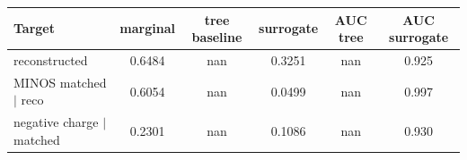 \begin{tabular}{lccccc}
\toprule
Target & marginal & tree baseline & surrogate & AUC tree & AUC surrogate \\
\midrule
reconstructed & 0.6484 & nan & 0.3251 & nan & 0.925 \\
MINOS matched $\mid$ reco & 0.6054 & nan & 0.0499 & nan & 0.997 \\
negative charge $\mid$ matched & 0.2301 & nan & 0.1086 & nan & 0.930 \\
\bottomrule
\end{tabular}
